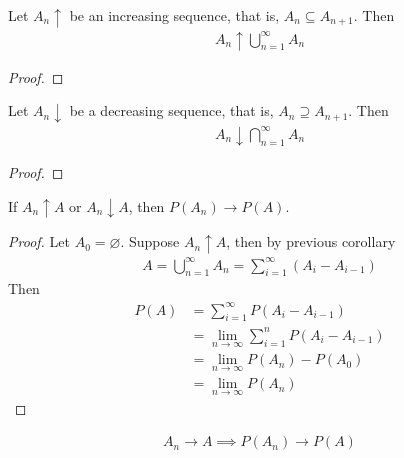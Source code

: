 \documentclass{article}
\begin{document}
   	\begin{corollary}
   		Let $A_n \uparrow$ be an increasing sequence, that is, $A_n \subseteq A_{n+1}$. Then
   		\begin{align}
   			A_n \uparrow \bigcup_{n=1}^\infty A_n
   		\end{align}
   	\end{corollary}
   	
   	\begin{proof}
   	\end{proof}
   	
   	\begin{corollary}
   		Let $A_n \downarrow$ be a decreasing sequence, that is, $A_{n} \supseteq A_{n+1}$. Then
   		\begin{align}
   			A_n \downarrow \bigcap_{n=1}^\infty A_n
   		\end{align}
   	\end{corollary}
   	
   	\begin{proof}
   	\end{proof}
   	
   	\begin{proposition}
   		If $A_n \uparrow A$ or $A_n \downarrow A$, then $P(A_n) \to P(A)$.
   	\end{proposition}
   	
   	\begin{proof}
   		Let $A_0 = \varnothing$. Suppose $A_n \uparrow A$, then by previous corollary
   		\begin{align}
   			A = \bigcup_{n=1}^\infty A_n = \sum_{i=1}^\infty (A_i - A_{i-1})
   		\end{align}
   		Then 
   		\begin{align}
   			P(A) &= \sum_{i=1}^\infty P(A_i - A_{i-1}) \\
   			&= \lim_{n\to\infty}\sum_{i=1}^n P(A_i - A_{i-1}) \\
   			&= \lim_{n\to\infty}P(A_n) - P(A_0) \\
   			&= \lim_{n\to\infty}P(A_n)
   		\end{align}
   	\end{proof}
   	
   	\begin{proposition}
   		\begin{align}
   			A_{n} \rightarrow A \implies P\left(A_{n}\right) \rightarrow P(A)
   		\end{align}
   	\end{proposition}
   	
\end{document}
